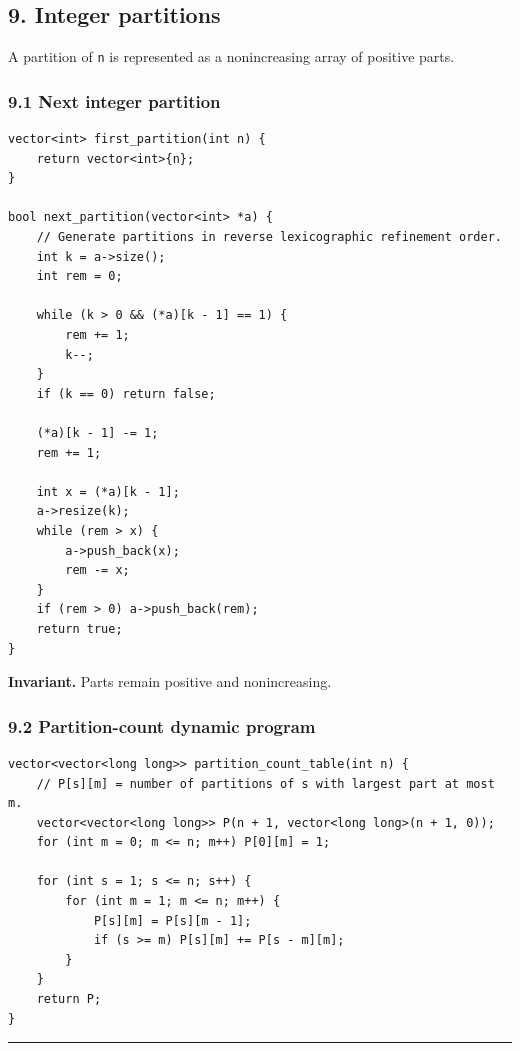 \documentclass[11pt]{article}
\begin{document}
\subsection{9. Integer partitions}\label{integer-partitions}

A partition of \texttt{n} is represented as a nonincreasing array of positive parts.

\subsubsection{9.1 Next integer partition}\label{next-integer-partition}

\begin{verbatim}
vector<int> first_partition(int n) {
    return vector<int>{n};
}

bool next_partition(vector<int> *a) {
    // Generate partitions in reverse lexicographic refinement order.
    int k = a->size();
    int rem = 0;

    while (k > 0 && (*a)[k - 1] == 1) {
        rem += 1;
        k--;
    }
    if (k == 0) return false;

    (*a)[k - 1] -= 1;
    rem += 1;

    int x = (*a)[k - 1];
    a->resize(k);
    while (rem > x) {
        a->push_back(x);
        rem -= x;
    }
    if (rem > 0) a->push_back(rem);
    return true;
}
\end{verbatim}

\textbf{Invariant.} Parts remain positive and nonincreasing.

\subsubsection{9.2 Partition-count dynamic program}\label{partition-count-dynamic-program}

\begin{verbatim}
vector<vector<long long>> partition_count_table(int n) {
    // P[s][m] = number of partitions of s with largest part at most m.
    vector<vector<long long>> P(n + 1, vector<long long>(n + 1, 0));
    for (int m = 0; m <= n; m++) P[0][m] = 1;

    for (int s = 1; s <= n; s++) {
        for (int m = 1; m <= n; m++) {
            P[s][m] = P[s][m - 1];
            if (s >= m) P[s][m] += P[s - m][m];
        }
    }
    return P;
}
\end{verbatim}

\begin{center}\rule{0.5\linewidth}{0.5pt}\end{center}
\end{document}
